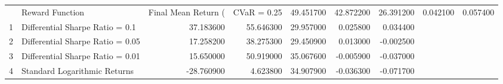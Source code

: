 \begin{tabular}{llrrrrr}
\toprule
 & Reward Function & Final Mean Return (%
 & CVaR = 0.25 & 49.451700 & 42.872200 & 26.391200 & 0.042100 & 0.057400 \\
1 & Differential Sharpe Ratio = 0.1 & 37.183600 & 55.646300 & 29.957000 & 0.025800 & 0.034400 \\
2 & Differential Sharpe Ratio = 0.05 & 17.258200 & 38.275300 & 29.450900 & 0.013000 & -0.002500 \\
3 & Differential Sharpe Ratio = 0.01 & 15.650000 & 50.919000 & 35.067600 & -0.005900 & -0.037000 \\
4 & Standard Logarithmic Returns & -28.760900 & 4.623800 & 34.907900 & -0.036300 & -0.071700 \\
\bottomrule
\end{tabular}
